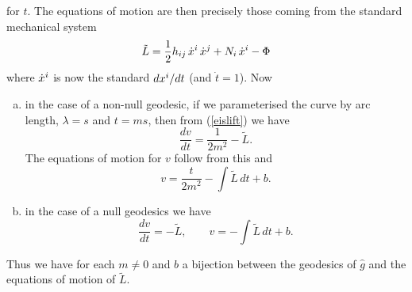 \documentclass{article}
\begin{document}
for $t$. The equations of motion are then precisely those coming from the standard mechanical system
$$\tilde L= \frac12 h_{ij}\, \dot x\sp{i}\, \dot x\sp{j}+N_i \,\dot x\sp{i}-\Phi $$
where $ \dot x\sp{i}$ is now the standard $d x\sp{i}/dt$ (and $\dot t = 1$). Now
\begin{enumerate}[(a)]
	\item in the case of a non-null geodesic, if we parameterised the curve by arc length, $\lambda=s$ and $t =ms$, then from (\ref{eislift}) we have 
	$$\frac{dv}{dt}= \frac1{2m^2} -\tilde L.$$
	The equations of motion for $v$ follow from this and
	$$v=\frac{t}{2m^2}-\int \tilde L\, dt +b.$$
	\item in the case of a null geodesics we have
	$$\frac{dv}{dt}=  -\tilde L,\qquad  v=-\int \tilde L\, dt +b.$$
\end{enumerate}
Thus we have for each $m\ne0$ and $b$ a bijection between the geodesics of $\hat g$ and the
equations of motion of $\tilde L$.
\end{document}
